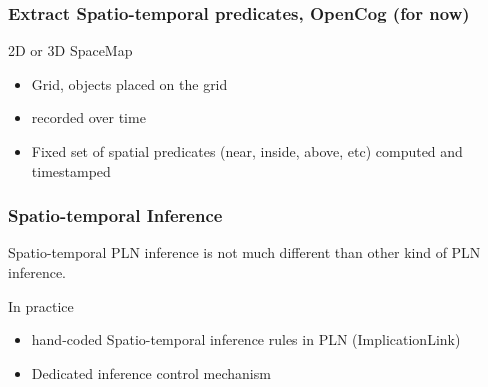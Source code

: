 \documentclass{beamer}
\begin{document}
\frame
{
  \frametitle{Extract Spatio-temporal predicates, \alert{OpenCog} (for now)}


  2D or 3D \alert{SpaceMap}
  \begin{itemize}
  \item<+-> \alert{Grid}, objects placed on the grid
  \item<+-> \alert{recorded} over time
  \item<7-> \alert{Fixed set of spatial predicates} (near, inside, above, etc)
    computed and \alert{timestamped}
  \end{itemize}
}

\frame
{
  \frametitle{Spatio-temporal Inference}

  Spatio-temporal PLN inference is not much different than
  other kind of PLN inference.\\[2ex]

  \pause

  \begin{beamerboxesrounded}{\alert{In practice}}
    \begin{itemize}
    \item \alert{hand-coded} Spatio-temporal inference
      rules in PLN (ImplicationLink)
    \item \alert{Dedicated} inference control mechanism
    \end{itemize}
  \end{beamerboxesrounded}
}
\end{document}
